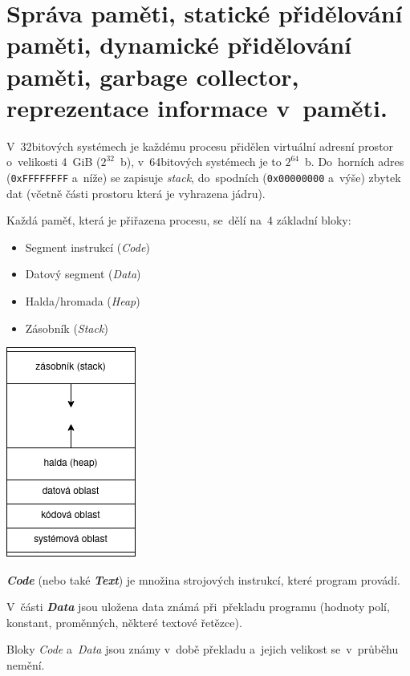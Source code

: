 \section{Správa paměti, statické přidělování paměti, dynamické přidělování paměti, garbage collector, reprezentace informace v~paměti.}

\begin{multicols}{2}
	V~32bitových systémech je každému procesu přidělen virtuální adresní prostor o~velikosti 4~GiB ($2^{32}$~b), v~64bitových systémech je to $2^{64}$~b. Do~horních adres (\texttt{0xFFFFFFFF} a~níže) se zapisuje \emph{stack}, do~spodních (\texttt{0x00000000} a~výše) zbytek dat (včetně části prostoru která je vyhrazena jádru).

	Každá paměť, která je přiřazena procesu, se~dělí na~4 základní bloky:

	\begin{itemize}
		\item Segment instrukcí (\emph{Code})
		\item Datový segment (\emph{Data})
		\item Halda/hromada (\emph{Heap})
		\item Zásobník (\emph{Stack})
	\end{itemize}

	\centering
	\includegraphics[scale=0.7]{images/pamet.png}
\end{multicols}

\emph{\textbf{Code}} (nebo také \emph{\textbf{Text}}) je množina strojových instrukcí, které program provádí.

V~části \emph{\textbf{Data}} jsou uložena data známá při~překladu programu (hodnoty polí, konstant, proměnných, některé textové řetězce).

Bloky \emph{Code} a~\emph{Data} jsou známy v~době překladu a~jejich velikost se~v~průběhu nemění.

